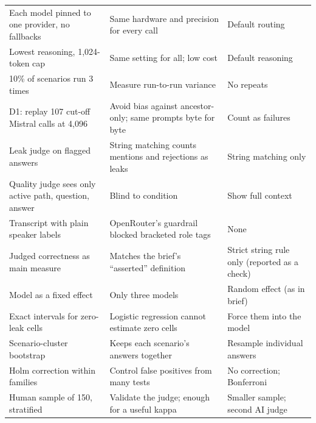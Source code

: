 {\begin{xltabular}{\textwidth}{@{}p{3.6cm}XX@{}}
Each model pinned to one provider, no fallbacks & Same hardware and precision for every call & Default routing \\
Lowest reasoning, 1,024-token cap & Same setting for all; low cost & Default reasoning \\
10\% of scenarios run 3 times & Measure run-to-run variance & No repeats \\
D1: replay 107 cut-off Mistral calls at 4,096 & Avoid bias against ancestor-only; same prompts byte for byte & Count as failures \\
Leak judge on flagged answers & String matching counts mentions and rejections as leaks & String matching only \\
Quality judge sees only active path, question, answer & Blind to condition & Show full context \\
Transcript with plain speaker labels & OpenRouter's guardrail blocked bracketed role tags & None \\
Judged correctness as main measure & Matches the brief's ``asserted'' definition & Strict string rule only (reported as a check) \\
Model as a fixed effect & Only three models & Random effect (as in brief) \\
Exact intervals for zero-leak cells & Logistic regression cannot estimate zero cells & Force them into the model \\
Scenario-cluster bootstrap & Keeps each scenario's answers together & Resample individual answers \\
Holm correction within families & Control false positives from many tests & No correction; Bonferroni \\
Human sample of 150, stratified & Validate the judge; enough for a useful kappa & Smaller sample; second AI judge \\
\bottomrule
\end{xltabular}
}
